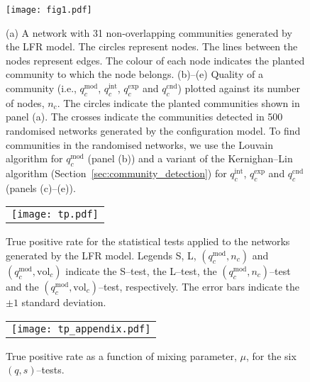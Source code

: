 \documentclass[fleqn,10pt]{wlscirep}
\def\qmod{q^{\text{mod}}}
\def\qint{q^{\text{int}}}
\def\qexp{q^{\text{exp}}}
\def\qcnd{q^{\text{cnd}}}
\def\vol{\text{vol}}
\begin{document}
\clearpage
\begin{figure}
    \texttt{[image: fig1.pdf]}
    \caption{
        (a) A network with 31 non-overlapping communities generated by the LFR model.
        The circles represent nodes. 
        The lines between the nodes represent edges. 
        The colour of each node indicates the planted community to which the node belongs.   
        (b)--(e) Quality of a community (i.e., $\qmod_c$, $\qint_c$, $\qexp_c$ and $\qcnd_c$) plotted against its number of nodes, $n_c$.
        The circles indicate the planted communities shown in panel (a).
        The crosses indicate the communities detected in 500 randomised networks generated by the configuration model. 
        To find communities in the randomised networks, we use the Louvain algorithm \cite{Blondel2008} for $\qmod_c$ (panel (b)) and 
        a variant of the Kernighan--Lin algorithm (Section~\ref{sec:community_detection}) for $\qint _c$, $\qexp _c$ and $\qcnd _c$  (panels (c)--(e)).
    }
    \label{fig:lfr}
\end{figure}
\clearpage
\begin{figure}
    \centering
    \begin{tabular}{c}
        \begin{minipage}[t][][b]{0.5\hsize}
            \centering
            \texttt{[image: tp.pdf]}
        \end{minipage}
    \end{tabular}
    \caption{
        True positive rate for the statistical tests applied to the networks generated by the LFR model.
        Legends S, L, $(\qmod_c, n_c)$ and $(\qmod_c, \vol_c)$ indicate the S--test, the L--test, the $(\qmod_c, n_c)$--test and the $(\qmod_c, \vol_c)$--test, respectively. 
        The error bars indicate the $\pm 1$ standard deviation. 
    }
    \label{fig:synthe_tp}
\end{figure}
\clearpage
\begin{figure}
    \centering
    \begin{tabular}{c}
        \begin{minipage}[t][][b]{0.5\hsize}
            \centering
            \texttt{[image: tp\_appendix.pdf]}
        \end{minipage}
    \end{tabular}
    \caption{
        True positive rate as a function of mixing parameter, $\mu$, for 
        the six $(q,s)$--tests. 
    }
    \label{fig:synthe_tp_other_qfunc}
\end{figure}
\end{document}
